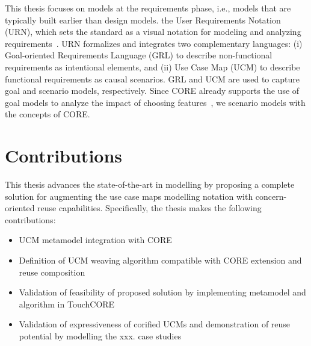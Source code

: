 This thesis focuses on  models at the requirements phase, i.e., models that are typically built earlier than design models.  the User Requirements Notation (URN), which sets the standard as a visual notation for modeling and analyzing requirements~\cite{amyot2002urn}. URN formalizes and integrates two complementary languages: (i) Goal-oriented Requirements Language (GRL) to describe non-functional requirements as intentional elements, and (ii) Use Case Map (UCM) to describe functional requirements as causal scenarios. GRL and UCM are used to capture goal and scenario models, respectively. Since CORE already supports the use of goal models to analyze the impact of choosing features~\cite{alam2013concern}, we  scenario models  with the concepts of CORE.

 

\section{Contributions}

This thesis advances the state-of-the-art in modelling by proposing a complete solution for augmenting the use case maps modelling notation with concern-oriented reuse capabilities. Specifically, the thesis makes the following contributions:


\begin{itemize}

\item UCM metamodel integration with CORE

\item Definition of UCM weaving algorithm compatible with CORE extension and reuse composition

\item Validation of feasibility of proposed solution by implementing metamodel and algorithm in TouchCORE

\item Validation of expressiveness of corified UCMs and demonstration of reuse potential by modelling the  xxx. case studies

\end{itemize}

